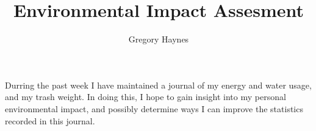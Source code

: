 \documentclass[letterpaper,10pt]{article}
\title{Environmental Impact Assesment}
\author{Gregory Haynes}
\begin{document}
\maketitle
\paragraph{}Durring the past week I have maintained a journal of my energy and water usage, and my trash weight.  In doing this, I hope to gain insight into my personal environmental impact, and possibly determine ways I can improve the statistics recorded in this journal.
\end{document}
